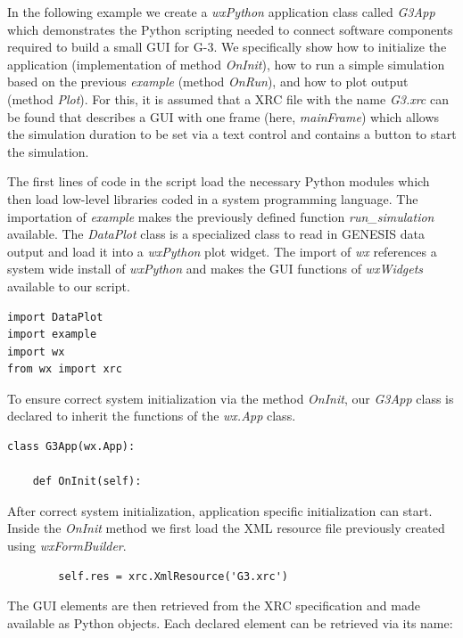 \documentclass[12pt]{article}
\begin{document}
In the following example we create a {\it wxPython} application class
called {\it G3App} which demonstrates the Python scripting needed to
connect software components required to build a small GUI for G-3.  We
specifically show how to initialize the application (implementation of
method {\it OnInit}), how to run a simple simulation based on the
previous {\it example} (method {\it OnRun}), and how to plot output
(method {\it Plot}).  For this, it is assumed that a XRC file with the
name {\it G3.xrc} can be found that describes a GUI with one frame
(here, {\it mainFrame}) which allows the simulation duration to be set
via a text control and contains a button to start the simulation.

The first lines of code in the script load the necessary Python
modules which then load low-level libraries coded in a system
programming language.  The importation of {\it example} makes the
previously defined function {\it run\_simulation} available.  The {\it
  DataPlot} class is a specialized class to read in GENESIS data
output and load it into a {\it wxPython} plot widget.  The import of
{\it wx} references a system wide install of {\it wxPython} and makes
the GUI functions of {\it wxWidgets} available to our script.

{\footnotesize
  \linenumbers*
\begin{verbatim}
import DataPlot
import example
import wx
from wx import xrc
\end{verbatim}
}

To ensure correct system initialization via the method {\it OnInit},
our {\it G3App} class is declared to inherit the functions of the {\it
  wx.App} class.

{\footnotesize
\linenumbers
 \begin{verbatim}
class G3App(wx.App):

    def OnInit(self):
 \end{verbatim}
}

After correct system initialization, application specific
initialization can start.  Inside the {\it OnInit} method we first
load the XML resource file previously created using {\it
  wxFormBuilder}.

{\footnotesize
   \linenumbers
 \begin{verbatim}
        self.res = xrc.XmlResource('G3.xrc')
 \end{verbatim}
}

The GUI elements are then retrieved from the XRC specification and
made available as Python objects.  Each declared element can be
retrieved via its name:
\end{document}
